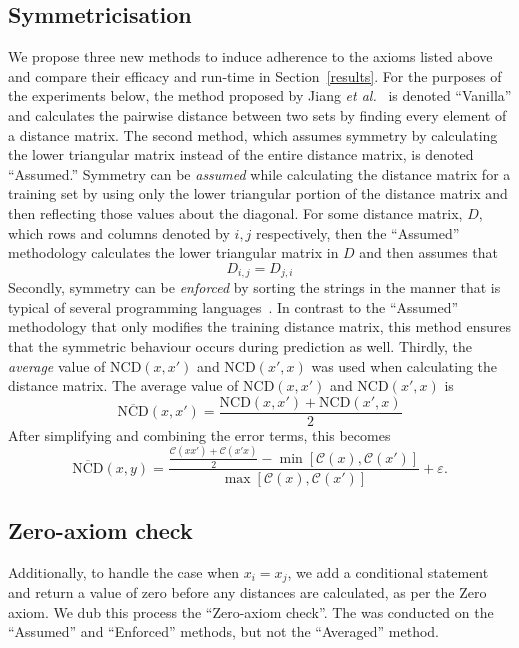 \documentclass[preprint,12pt]{article}
\begin{document}
\subsection{Symmetricisation}
\label{modifications}

We propose three new methods to induce adherence to the axioms listed above and compare their efficacy and run-time in Section~\ref{results}.
For the purposes of the experiments below, the method proposed by Jiang \textit{et al.}~\cite{jiang2022less} is denoted ``Vanilla'' and calculates the pairwise distance between two sets by finding every element of a distance matrix. 
The second method, which assumes symmetry by calculating the lower triangular matrix instead of the entire distance matrix, is denoted ``Assumed.''
Symmetry can be \textit{assumed} while calculating the distance matrix for a training set by using only the lower triangular portion of the distance matrix and then reflecting those values about the diagonal.
For some distance matrix, $D$, which rows and columns denoted by $i,j$ respectively, then the ``Assumed'' methodology calculates the lower triangular matrix in $D$ and then assumes that 
\begin{equation}
    D_{i,j} = D_{j,i}
    \label{eq:assumed}
\end{equation}
Secondly, symmetry can be \textit{enforced} by sorting the strings in the manner that is typical of several programming languages~\cite{}.
In contrast to the ``Assumed'' methodology that only modifies the training distance matrix, this method ensures that the symmetric behaviour occurs during prediction as well.
Thirdly, the \textit{average} value of $\text{NCD}(x,x')$ and $\text{NCD}(x',x)$ was used when calculating the distance matrix.
The average value of $\text{NCD}(x,x')$ and $\text{NCD}(x',x)$ is
$$
    \overline{\text{NCD}}(x,x') = \frac{\text{NCD}(x,x') + \text{NCD}(x', x)}{2}
$$
After simplifying and combining the error terms, this becomes
\begin{equation}
    \overline{\text{NCD}}(x, y) = \frac{\frac{\mathcal{C}(xx') + \mathcal{C}(x'x)}{2} - \min[\mathcal{C}(x), \mathcal{C}(x')]}{\max[\mathcal{C}(x), \mathcal{C}(x')]} + \varepsilon.
\end{equation}

\subsection{Zero-axiom check }
Additionally, to handle the case when $x_i = x_j$, we add a conditional statement and return a value of zero before any distances are calculated, as per the Zero axiom. 
We dub this process the ``Zero-axiom check''. 
The was conducted on the ``Assumed'' and ``Enforced'' methods, but not the ``Averaged'' method.
\end{document}
